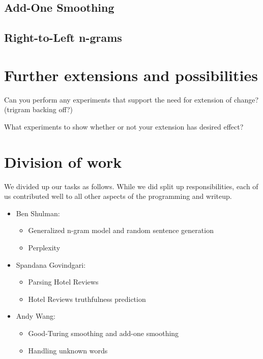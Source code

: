 \documentclass{article}
\begin{document}
\subsection{Add-One Smoothing}

\subsection{Right-to-Left n-grams}

\section{Further extensions and possibilities}
Can you perform any experiments that support the need for extension of change? (trigram backing off?)\par
What experiments to show whether or not your extension has desired effect?\par
\lipsum[4]

\section{Division of work}
We divided up our tasks as follows. While we did split up responsibilities, each of us contributed well to all other aspects of the programming and writeup.

\begin{itemize}[noitemsep]
\item Ben Shulman:
  \begin{itemize}[noitemsep,nolistsep]
  \item Generalized n-gram model and random sentence generation
  \item Perplexity
  \end{itemize}
\item Spandana Govindgari:
  \begin{itemize}[noitemsep,nolistsep]
  \item Parsing Hotel Reviews
  \item Hotel Reviews truthfulness prediction
  \end{itemize}
\item Andy Wang:
  \begin{itemize}[noitemsep,nolistsep]
  \item Good-Turing smoothing and add-one smoothing
  \item Handling unknown words
  \end{itemize}
\end{itemize}
\end{document}
